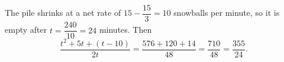The pile shrinks at a net rate of $15-\dfrac{15}{3}=10$ snowballs per minute, so it is empty after $t=\dfrac{240}{10}=24$ minutes. Then
\[
\dfrac{t^2+5t+(t-10)}{2t}=\dfrac{576+120+14}{48}=\dfrac{710}{48}=\boxed{\dfrac{355}{24}}.
\]

